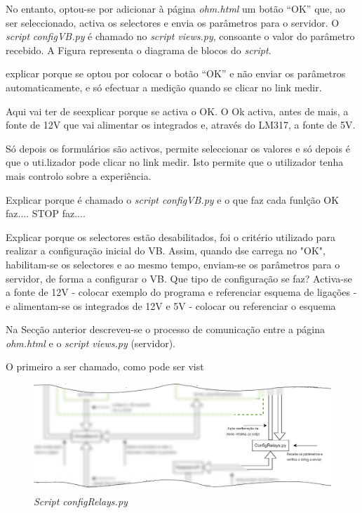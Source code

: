 No entanto, optou-se por adicionar à página \textit{ohm.html} um botão ``OK'' que, ao ser seleccionado, activa os selectores e envia os parâmetros para o servidor. O \textit{script} \textit{configVB.py} é chamado no \textit{script views.py}, consoante o valor do parâmetro recebido. A Figura  representa o diagrama de blocos do \textit{script}.

explicar porque se optou por colocar o botão ``OK'' e não enviar os parâmetros automaticamente, e só efectuar a medição quando se clicar no link medir.

Aqui vai ter de seexplicar porque se activa o OK. O Ok activa, antes de mais, a fonte de 12V que vai alimentar os integrados e, através do LM317, a fonte de 5V. 

Só depois os formulários são activos, permite seleccionar os valores e só depois é que o uti.lizador pode clicar no link medir.
Isto permite que o utilizador tenha mais controlo sobre a experiência.

Explicar porque é chamado o \textit{script configVB.py} e o que faz cada funlção
OK faz....
STOP faz....

Explicar porque os selectores estão desabilitados, foi o critério utilizado para realizar a configuração inicial do VB. Assim, quando dse carrega no "OK", habilitam-se os selectores e ao mesmo tempo, enviam-se os parâmetros para o servidor, de forma a configurar o VB. Que tipo de configuração se faz? Activa-se a fonte de 12V - colocar exemplo do programa e referenciar esquema de ligações - e alimentam-se os integrados de 12V e 5V - colocar ou referenciar o esquema

Na Secção anterior descreveu-se o processo de comunicação entre a página \textit{ohm.html} e o \textit{script views.py} (servidor).

O primeiro a ser chamado, como pode ser vist
\begin{figure}[hbtp]
	\centering
	\includegraphics[width=1\textwidth]{figures/ohm_diagramaCUTRelay.drawio.png}
	\caption{\textit{Script configRelays.py}}
	\label{fig:cutconfigRelays}
\end{figure}

